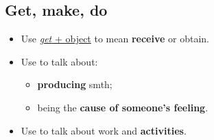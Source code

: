 \subsection{Get, make, do}
\begin{itemize}
    \item Use \underline{\textit{get} + object} to mean \textbf{receive} or obtain.
    \item Use  to talk about:
    \begin{itemize}
        \item \textbf{producing} smth;
        \item being the \textbf{cause of someone's feeling}.
    \end{itemize}
    \item Use  to talk about work and \textbf{activities}.
\end{itemize}

